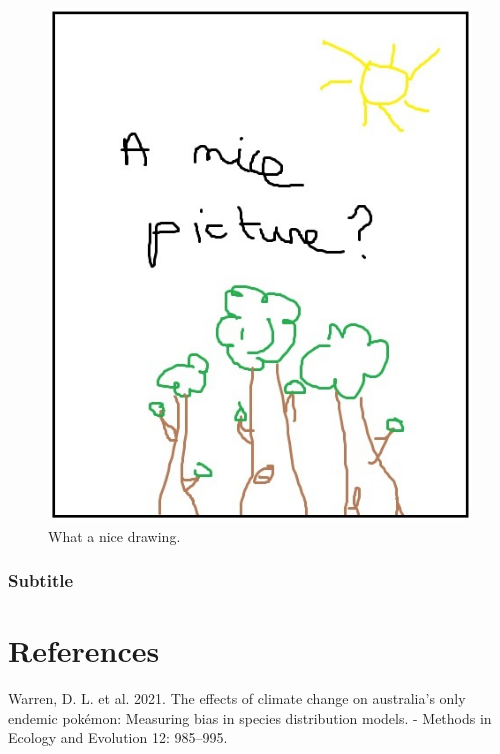 \documentclass[12pt,twoside,a4paper, a]{article}
\newlength{\cslhangindent}
\newenvironment{CSLReferences}[2] %
 {%
  \setlength{\parindent}{0pt}
  \ifodd #1 \everypar{\setlength{\hangindent}{\cslhangindent}}\ignorespaces\fi
  \ifnum #2 > 0
  \setlength{\parskip}{#2\baselineskip}
  \fi
 }%
 {}
\let\oldsection\section
\renewcommand\section{\clearpage\oldsection}
\begin{document}
\lipsum[1-3]

\begin{figure}[H]

{\centering \includegraphics[width=\linewidth]{figures/nice_figure} 

}

\caption{What a nice drawing.}\label{fig:nicefigure}
\end{figure}

\hypertarget{subtitle-4}{%
\subsubsection{Subtitle}\label{subtitle-4}}

\lipsum[4-7]

\hypertarget{references}{%
\section*{References}\label{references}}

\hypertarget{refs}{}
\begin{CSLReferences}{1}{0}
\leavevmode{}%
Warren, D. L. et al. 2021. The effects of climate change on australia's only endemic pokémon: Measuring bias in species distribution models. - Methods in Ecology and Evolution 12: 985--995.

\end{CSLReferences}



\end{document}
